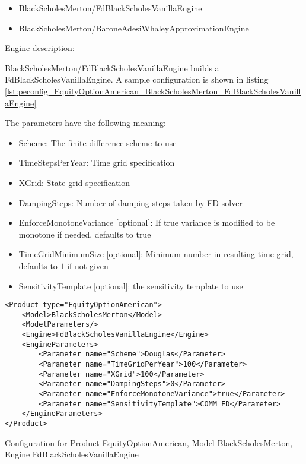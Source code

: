 \begin{itemize}
\item BlackScholesMerton/FdBlackScholesVanillaEngine
\item BlackScholesMerton/BaroneAdesiWhaleyApproximationEngine
\end{itemize}

Engine description:

BlackScholesMerton/FdBlackScholesVanillaEngine builds a FdBlackScholesVanillaEngine. A sample configuration is shown in listing
\ref{lst:peconfig_EquityOptionAmerican_BlackScholesMerton_FdBlackScholesVanillaEngine}

The parameters have the following meaning:

\begin{itemize}
\item Scheme: The finite difference scheme to use
\item TimeStepsPerYear: Time grid specification
\item XGrid: State grid specification
\item DampingSteps: Number of damping steps taken by FD solver
\item EnforceMonotoneVariance [optional]: If true variance is modified to be monotone if needed, defaults to true
\item TimeGridMinimumSize [optional]: Minimum number in resulting time grid, defaults to $1$ if not given
\item SensitivityTemplate [optional]: the sensitivity template to use 
\end{itemize}

\begin{longlisting}
\begin{verbatim}
<Product type="EquityOptionAmerican">
    <Model>BlackScholesMerton</Model>
    <ModelParameters/>
    <Engine>FdBlackScholesVanillaEngine</Engine>
    <EngineParameters>
        <Parameter name="Scheme">Douglas</Parameter>
        <Parameter name="TimeGridPerYear">100</Parameter>
        <Parameter name="XGrid">100</Parameter>
        <Parameter name="DampingSteps">0</Parameter>
        <Parameter name="EnforceMonotoneVariance">true</Parameter>
        <Parameter name="SensitivityTemplate">COMM_FD</Parameter>
    </EngineParameters>
</Product>
\end{verbatim}
\caption{Configuration for Product EquityOptionAmerican, Model BlackScholesMerton, Engine FdBlackScholesVanillaEngine}
\label{lst:peconfig_EquityOptionAmerican_BlackScholesMerton_FdBlackScholesVanillaEngine}
\end{longlisting}

